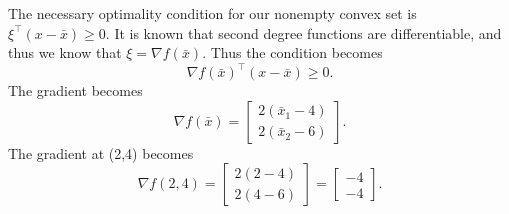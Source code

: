 \documentclass{article}
\begin{document}
	The necessary optimality condition for our nonempty convex set is $\xi^\top (x -\bar{x}) \geq  0$. It is known that second degree functions are differentiable, and thus we know that $\xi = \nabla f(\bar{x})$. Thus the condition becomes
	\begin{equation}
		\nabla f(\bar{x})^\top (x -\bar{x}) \geq 0.
	\end{equation}
	The gradient becomes 
	\begin{equation}
		\nabla f(\bar{x}) = 
		\begin{bmatrix}
			2(\bar{x}_1-4) \\
			2(\bar{x}_2-6)
		\end{bmatrix}.
	\end{equation}
	The gradient at (2,4) becomes 
		\begin{equation}
		\nabla f(2,4) = 
		\begin{bmatrix}
			2(2-4) \\
			2(4-6)
		\end{bmatrix} =
		\begin{bmatrix}
			-4 \\
			-4
		\end{bmatrix} .
	\end{equation}
\end{document}
